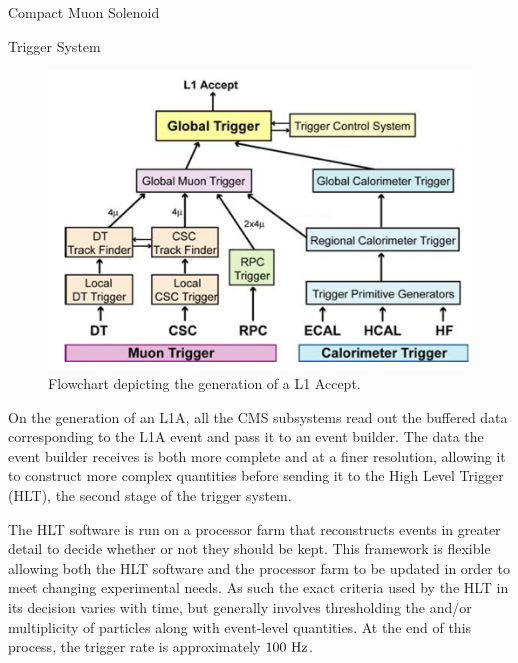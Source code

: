 \begin{section}{Compact Muon Solenoid}
\begin{subsection}{Trigger System}
\begin{figure}[tbp!]
\begin{center}
\includegraphics[angle=0,width=0.80\columnwidth]{fig/cms_trigger.png}
\end{center}
\caption{Flowchart depicting the generation of a L1 Accept.~\cite{1748-0221-3-08-S08004}}
\label{fig:cms_trigger}
\end{figure}

On the generation of an L1A, all the CMS subsystems read out the buffered data corresponding to the L1A event and pass it to an event builder.
The data the event builder receives is both more complete and at a finer resolution, allowing it to construct more complex quantities before sending it to the High Level Trigger (HLT), the second stage of the trigger system.

The HLT software is run on a processor farm that reconstructs events in greater detail to decide whether or not they should be kept.
This framework is flexible allowing both the HLT software and the processor farm to be updated in order to meet changing experimental needs.
As such the exact criteria used by the HLT in its decision varies with time, but generally involves thresholding the \pT and/or multiplicity of particles along with event-level quantities.
At the end of this process, the trigger rate is approximately $100~\mathrm{Hz}$.

\end{subsection}

\end{section}


